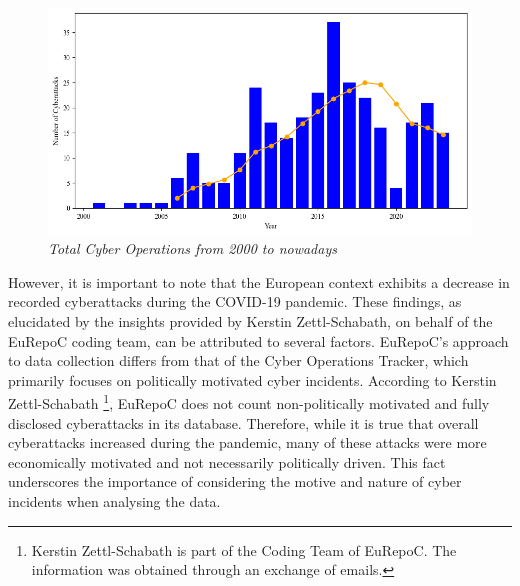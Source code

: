 \begin{figure}[H]
    \centering
    \includegraphics[width=1\textwidth]{Images/total_cyber_EU.png}
    \caption{\textit{Total Cyber Operations from 2000 to nowadays}}
    \label{total_cyber_EU.png}
\end{figure}


However, it is important to note that the European context exhibits a decrease in recorded cyberattacks during the COVID-19 pandemic. These findings, as elucidated by the insights provided by Kerstin Zettl-Schabath, on behalf of the EuRepoC coding team, can be attributed to several factors. EuRepoC's approach to data collection differs from that of the Cyber Operations Tracker, which primarily focuses on politically motivated cyber incidents. According to Kerstin Zettl-Schabath \footnote{Kerstin Zettl-Schabath is part of the Coding Team of EuRepoC. The information was obtained through an exchange of emails.}, EuRepoC does not count non-politically motivated and fully disclosed cyberattacks in its database. Therefore, while it is true that overall cyberattacks increased during the pandemic, many of these attacks were more economically motivated and not necessarily politically driven. This fact underscores the importance of considering the motive and nature of cyber incidents when analysing the data.

